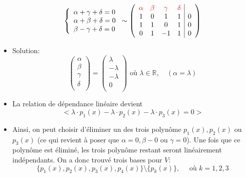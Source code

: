 \documentclass[
    11pt,
    a4paper,
    oneside,
    headinlcude, footinclude,
    twoside,
]{report}
\begin{document}
\begin{itemize}
        $$
        \left\{
            \begin{array}{l}
            \alpha + \gamma + \delta = 0\\
            \alpha + \beta + \delta = 0\\
            \beta - \gamma + \delta = 0\\
            \end{array}
        \right.
        \sim  
        \left(
            \begin{array}{cccc|c}
                {\color{red} \alpha} & {\color{red} \beta} & {\color{red} \gamma}
                &{\color{red} \delta}\\
                1 & 0 & 1 & 1 & 0\\
                1 & 1 & 0 & 1 & 0\\
                0 & 1 & -1 & 1 & 0\\
            \end{array}
        \right)
        $$
    \item Solution:
        $$\left( 
            \begin{array}{c} 
                \alpha\\
                \beta\\
                \gamma\\
                \delta\\ 
            \end{array} 
        \right) = 
        \left( 
            \begin{array}{c} 
                \lambda\\
                - \lambda\\
                -\lambda\\
                0\\ 
            \end{array} 
        \right) \text{ où } \lambda \in \mathbb{R}, \quad (\alpha = \lambda)
        $$

    \item La relation de dépendance linéaire devient 
        $$< \lambda \cdot p_{1} (x) - \lambda \cdot p_{2}(x) - \lambda \cdot
        p_{3}(x) = 0>$$

    \item Ainsi, on peut choisir d'éliminer un des trois polynôme $p_{1}(x),
        p_{2}(x)$ ou $p_{3}(x)$ (ce qui revient à poser que $\alpha = 0, \beta
        - 0$ ou $\gamma = 0$). Une fois que ce polynôme est éliminé, les trois
        polynôme restant seront linéairement indépendants. On a donc trouvé
        trois bases pour $V$:
        $$ \{p_{1}(x), p_{2}(x), p_{3}(x), p_{4}(x)\} \setminus \{p_{k}(x)\},
        \quad \text{ où } k = 1, 2, 3$$


\end{itemize}
\end{document}
